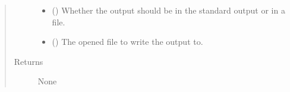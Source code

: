 \documentclass[letterpaper,10pt,english]{sphinxmanual}
\begin{document}
\begin{fulllineitems}
\begin{quote}
\begin{description}
\begin{itemize}
\item {} 
 () \textendash{} Whether the output should be in the standard 
output or in a file.

\item {} 
 () \textendash{} The opened file to write the output to.

\end{itemize}

\item[{Returns}] \leavevmode
None

\end{description}\end{quote}

\end{fulllineitems}

\end{document}
